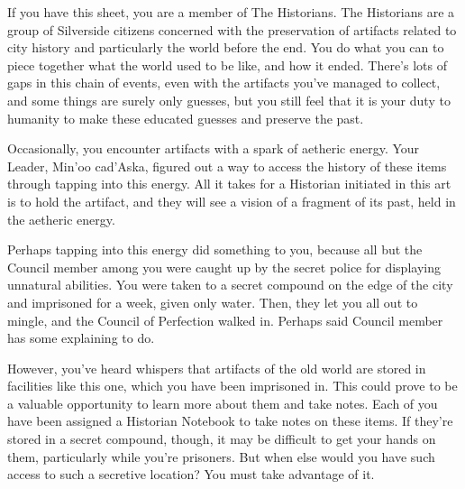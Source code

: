 \documentclass[blue]{Silversiders}
\begin{document}
\name{\bHistorians{}}

If you have this sheet, you are a member of The Historians. The Historians are a group of Silverside citizens concerned with the preservation of artifacts related to city history and particularly the world before the end. You do what you can to piece together what the world used to be like, and how it ended. There's lots of gaps in this chain of events, even with the artifacts you've managed to collect, and some things are surely only guesses, but you still feel that it is your duty to humanity to make these educated guesses and preserve the past.

Occasionally, you encounter artifacts with a spark of aetheric energy. Your Leader, Min'oo cad'Aska, figured out a way to access the history of these items through tapping into this energy. All it takes for a Historian initiated in this art is to hold the artifact, and they will see a vision of a fragment of its past, held in the aetheric energy.

Perhaps tapping into this energy did something to you, because all but the Council member among you were caught up by the secret police for displaying unnatural abilities. You were taken to a secret compound on the edge of the city and imprisoned for a week, given only water. Then, they let you all out to mingle, and the Council of Perfection walked in. Perhaps said Council member has some explaining to do.

However, you've heard whispers that artifacts of the old world are stored in facilities like this one, which you have been imprisoned in. This could prove to be a valuable opportunity to learn more about them and take notes. Each of you have been assigned a Historian Notebook to take notes on these items. If they're stored in a secret compound, though, it may be difficult to get your hands on them, particularly while you're prisoners. But when else would you have such access to such a secretive location? You must take advantage of it.

\end{document}
